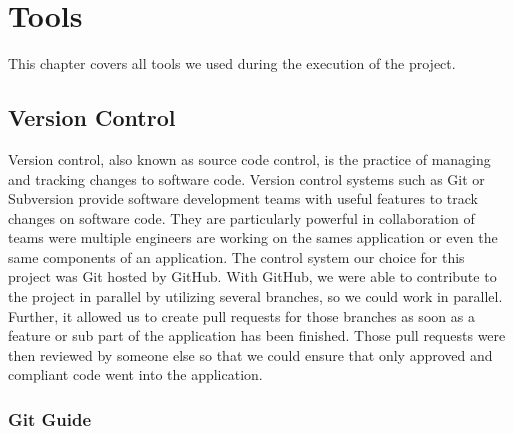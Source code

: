 \chapter{Tools}\label{ch:tools}

This chapter covers all tools we used during the execution of the project.


\section{Version Control}\label{sec:version-control}

Version control, also known as source code control, is the practice of managing and tracking changes to software code.
Version control systems such as Git or Subversion provide software development teams with useful features to track
changes on software code.
They are particularly powerful in collaboration of teams were multiple engineers are working on the sames application
or even the same components of an application.
The control system our choice for this project was Git hosted by GitHub.
With GitHub, we were able to contribute to the project in parallel by utilizing several branches, so we could work in
parallel.
Further, it allowed us to create pull requests for those branches as soon as a feature or sub part of the application
has been finished.
Those pull requests were then reviewed by someone else so that we could ensure that only approved and compliant code
went into the application.

\subsection{Git Guide}

